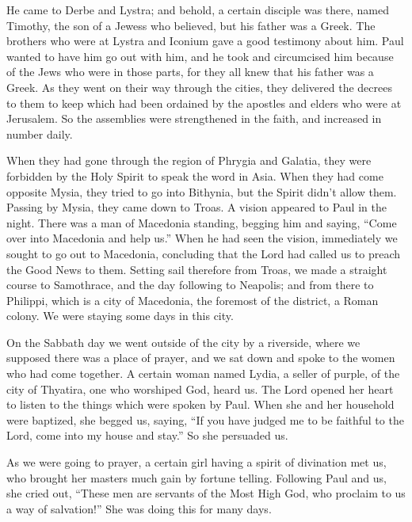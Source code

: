  He came to Derbe and Lystra; and behold, a certain disciple
was there, named Timothy, the son of a Jewess who believed, but his
father was a Greek.  The brothers who were at Lystra and
Iconium gave a good testimony about him.  Paul wanted to
have him go out with him, and he took and circumcised him because of the
Jews who were in those parts, for they all knew that his father was a
Greek.  As they went on their way through the cities, they
delivered the decrees to them to keep which had been ordained by the
apostles and elders who were at Jerusalem.  So the
assemblies were strengthened in the faith, and increased in number
daily.

 When they had gone through the region of Phrygia and
Galatia, they were forbidden by the Holy Spirit to speak the word in
Asia.  When they had come opposite Mysia, they tried to go
into Bithynia, but the Spirit didn't allow them.  Passing by
Mysia, they came down to Troas.  A vision appeared to Paul
in the night. There was a man of Macedonia standing, begging him and
saying, ``Come over into Macedonia and help us.''  When he
had seen the vision, immediately we sought to go out to Macedonia,
concluding that the Lord had called us to preach the Good News to them.
 Setting sail therefore from Troas, we made a straight
course to Samothrace, and the day following to Neapolis; 
and from there to Philippi, which is a city of Macedonia, the foremost
of the district, a Roman colony. We were staying some days in this city.

 On the Sabbath day we went outside of the city by a
riverside, where we supposed there was a place of prayer, and we sat
down and spoke to the women who had come together.  A
certain woman named Lydia, a seller of purple, of the city of Thyatira,
one who worshiped God, heard us. The Lord opened her heart to listen to
the things which were spoken by Paul.  When she and her
household were baptized, she begged us, saying, ``If you have judged me
to be faithful to the Lord, come into my house and stay.'' So she
persuaded us.

 As we were going to prayer, a certain girl having a spirit
of divination met us, who brought her masters much gain by fortune
telling.  Following Paul and us, she cried out, ``These men
are servants of the Most High God, who proclaim to us a way of
salvation!''  She was doing this for many days.

